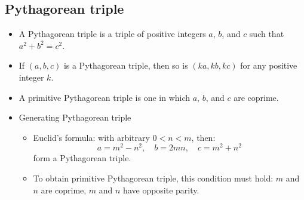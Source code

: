 \subsection{Pythagorean triple}
\begin{itemize}
  \item A Pythagorean triple is a triple of positive integers $a$, $b$, and $c$ such that $a^2 + b^2 = c^2$.
  \item If $(a, b, c)$ is a Pythagorean triple, then so is $(ka, kb, kc)$ for any positive integer $k$.
  \item A primitive Pythagorean triple is one in which $a$, $b$, and $c$ are coprime.
  \item Generating Pythagorean triple
  \begin{itemize}
    \item Euclid's formula: with arbitrary $0 < n < m$, then: $$a = m^2 - n^2, \quad b = 2mn,\quad c = m^2 + n^2$$ form a Pythagorean triple.
    \item To obtain primitive Pythagorean triple, this condition must hold: $m$ and $n$ are coprime, $m$ and $n$ have opposite parity.
  \end{itemize}
\end{itemize}
